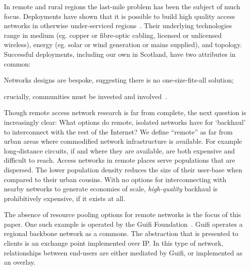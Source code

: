 In remote and rural regions the last-mile problem has been the subject
of much focus. Deployments
have shown that it is possible to build high quality access networks
in otherwise under-serviced regions~\cite{guifi, tegola,Hasan:2015}.
Their underlying technologies range in medium (eg. copper or
fibre-optic cabling, licensed or unlicensed wireless), energy (eg.
solar or wind generation or mains supplied), and topology.
Successful deployments, including our own in Scotland,
have two attributes in common:
\begin{inparaenum}[(i)]
  \item Networks designs are bespoke, suggesting
    there is no one-size-fits-all solution;
  \item crucially, communities must be invested and
    involved~\cite{Wallace:2015a}.%
\end{inparaenum}

Though remote access network research is far from complete, the next
question is increasingly clear: What options do remote, isolated
networks have for `backhaul' to interconnect with the rest of the
Internet? We define ``remote'' as far from urban areas where
commodified network infrastructure is available. For example
long-distance circuits, if and where they are available, are both
expensive and difficult to reach. Access networks in remote places
serve populations that are dispersed. The lower population density
reduces the size of their user-base when compared to their urban
cousins. With no options for interconnecting with nearby networks to
generate economies of scale, \emph{high-quality} backhaul is
prohibitively expensive, if it exists at all.


The absence of resource pooling options for remote networks is the focus of this
paper. One such example is operated by the Guifi Foundation~\cite{guifi}. Guifi
operates a regional backbone network as a commons. The abstraction that is
presented to clients is an exchange point implemented over IP. In this type of
network, relationships between end-users are either mediated by Guifi, or
implemented as an overlay.

